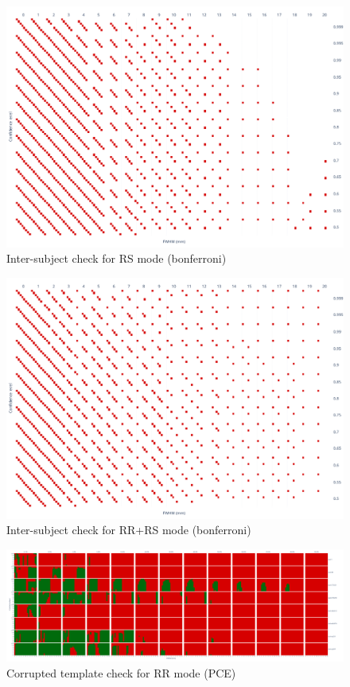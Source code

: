 \documentclass{article}
\begin{document}
\begin{figure}
    \centering
    \includegraphics[width=\linewidth]{figures/inter-subject/one_mct_fwe_bonferroni__RS.pdf}
    \caption{Inter-subject check for RS mode (bonferroni)}
\end{figure}

\begin{figure}
    \centering
    \includegraphics[width=\linewidth]{figures/inter-subject/one_mct_fwe_bonferroni__RR+RS.pdf}
    \caption{Inter-subject check for RR+RS mode (bonferroni)}
\end{figure}

\begin{figure}
    \centering
    \includegraphics[width=\linewidth]{figures/inter-subject/one_pce_template_RR.pdf}
    \caption{Corrupted template check for RR mode (PCE)}
\end{figure}
\end{document}
